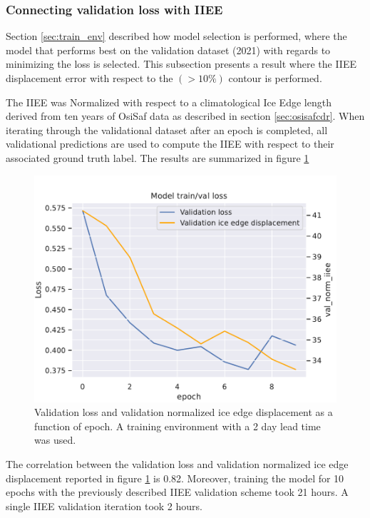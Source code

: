 \documentclass[../main/thesis]{subfiles}
\begin{document}
\subsubsection{Connecting validation loss with IIEE}
Section \ref{sec:train_env} described how model selection is performed, where the model that performs best on the validation dataset (2021) with regards to minimizing the loss is selected. This subsection presents a result where the IIEE displacement error \citep{Goessling2016, Melsom2019} with respect to the $(>10\%)$ contour is performed. 

The IIEE was Normalized with respect to a climatological Ice Edge length derived from ten years of OsiSaf data as described in section \ref{sec:osisafcdr}. When iterating through the validational dataset after an epoch is completed, all validational predictions are used to compute the IIEE with respect to their associated ground truth label. The results are summarized in figure \ref{fig:val_loss_iiee}

\begin{figure}
    \centering
    \includegraphics[width=\textwidth]{val_loss_iiee}
    \caption{\label{fig:val_loss_iiee}Validation loss and validation normalized ice edge displacement as a function of epoch. A training environment with a 2 day lead time was used.}
\end{figure}

The correlation between the validation loss and validation normalized ice edge displacement reported in figure \ref{fig:val_loss_iiee} is 0.82. Moreover, training the model for 10 epochs with the previously described IIEE validation scheme took 21 hours. A single IIEE validation iteration took 2 hours. 

\biblio
\end{document}
